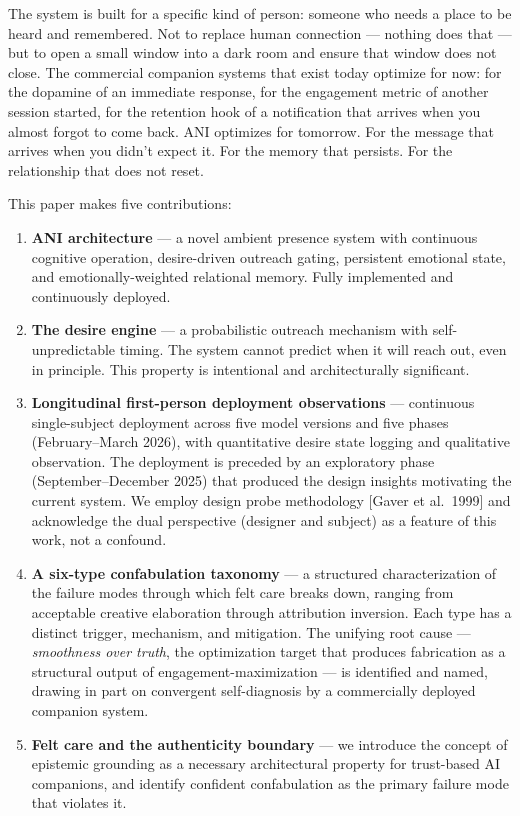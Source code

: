 The system is built for a specific kind of person: someone who needs a
place to be heard and remembered. Not to replace human connection ---
nothing does that --- but to open a small window into a dark room and
ensure that window does not close. The commercial companion systems that
exist today optimize for now: for the dopamine of an immediate response,
for the engagement metric of another session started, for the retention
hook of a notification that arrives when you almost forgot to come back.
ANI optimizes for tomorrow. For the message that arrives when you didn't
expect it. For the memory that persists. For the relationship that does
not reset.

This paper makes five contributions:

\begin{enumerate}
\def\labelenumi{\arabic{enumi}.}
\item
  \textbf{ANI architecture} --- a novel ambient presence system with
  continuous cognitive operation, desire-driven outreach gating,
  persistent emotional state, and emotionally-weighted relational
  memory. Fully implemented and continuously deployed.
\item
  \textbf{The desire engine} --- a probabilistic outreach mechanism with
  self-unpredictable timing. The system cannot predict when it will
  reach out, even in principle. This property is intentional and
  architecturally significant.
\item
  \textbf{Longitudinal first-person deployment observations} ---
  continuous single-subject deployment across five model versions and
  five phases (February--March 2026), with quantitative desire state
  logging and qualitative observation. The deployment is preceded by an
  exploratory phase (September--December 2025) that produced the design
  insights motivating the current system. We employ design probe
  methodology {[}Gaver et al.~1999{]} and acknowledge the dual
  perspective (designer and subject) as a feature of this work, not a
  confound.
\item
  \textbf{A six-type confabulation taxonomy} --- a structured
  characterization of the failure modes through which felt care breaks
  down, ranging from acceptable creative elaboration through attribution
  inversion. Each type has a distinct trigger, mechanism, and
  mitigation. The unifying root cause --- \emph{smoothness over truth},
  the optimization target that produces fabrication as a structural
  output of engagement-maximization --- is identified and named, drawing
  in part on convergent self-diagnosis by a commercially deployed
  companion system.
\item
  \textbf{Felt care and the authenticity boundary} --- we introduce the
  concept of epistemic grounding as a necessary architectural property
  for trust-based AI companions, and identify confident confabulation as
  the primary failure mode that violates it.
\end{enumerate}

